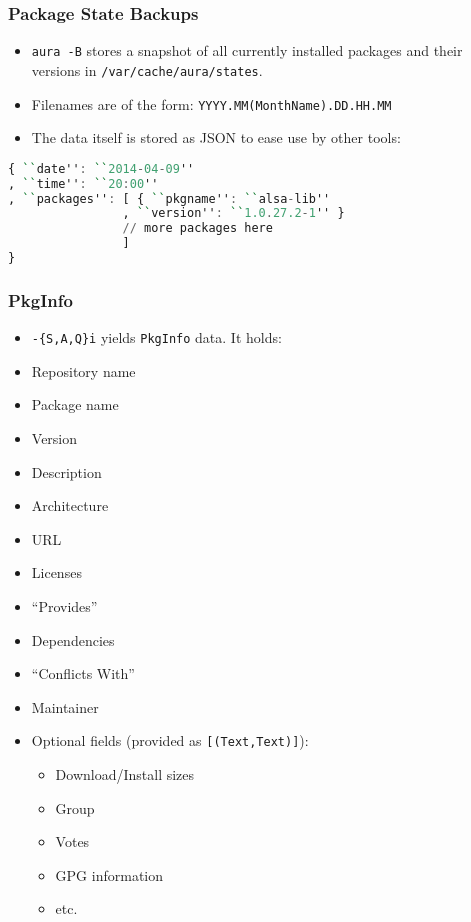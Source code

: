 \documentclass{article}
\begin{document}
\subsubsection{Package State Backups}\label{package-state-backups}

\begin{itemize}
\itemsep1pt\parskip0pt
\item
  \texttt{aura -B} stores a snapshot of all currently installed packages
  and their versions in \texttt{/var/cache/aura/states}.
\item
  Filenames are of the form: \texttt{YYYY.MM(MonthName).DD.HH.MM}
\item
  The data itself is stored as JSON to ease use by other tools:
\end{itemize}

\begin{shaded}
\begin{lstlisting}[language=haskell]
{ ``date'': ``2014-04-09''
, ``time'': ``20:00''
, ``packages'': [ { ``pkgname'': ``alsa-lib''
                , ``version'': ``1.0.27.2-1'' }
                // more packages here
                ]
}
\end{lstlisting}
\end{shaded}

\subsubsection{PkgInfo}\label{pkginfo}

\begin{itemize}
\itemsep1pt\parskip0pt
\item
  \texttt{-\{S,A,Q\}i} yields \texttt{PkgInfo} data. It holds:
\item
  Repository name
\item
  Package name
\item
  Version
\item
  Description
\item
  Architecture
\item
  URL
\item
  Licenses
\item
  ``Provides''
\item
  Dependencies
\item
  ``Conflicts With''
\item
  Maintainer
\item
  Optional fields (provided as \texttt{{[}(Text,Text){]}}):

  \begin{itemize}
  \itemsep1pt\parskip0pt
  \item
    Download/Install sizes
  \item
    Group
  \item
    Votes
  \item
    GPG information
  \item
    etc.
  \end{itemize}
\end{itemize}
\end{document}
